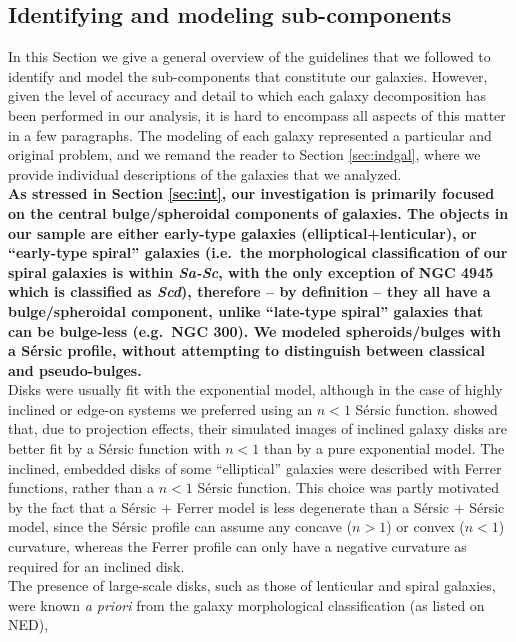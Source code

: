 \documentclass[preprint2]{emulateapj}
\begin{document}
\subsection{Identifying and modeling sub-components}
\label{sec:cpts}
In this Section we give a general overview of the guidelines that we followed to identify and model 
the sub-components that constitute our galaxies. 
However, given the level of accuracy and detail to which each galaxy decomposition has been performed in our analysis,
it is hard to encompass all aspects of this matter in a few paragraphs.
The modeling of each galaxy represented a particular and original problem, 
and we remand the reader to Section \ref{sec:indgal},
where we provide individual descriptions of the galaxies that we analyzed. \\
{\bf As stressed in Section \ref{sec:int}, our investigation is primarily focused on the central bulge/spheroidal components 
of galaxies. 
The objects in our sample are either early-type galaxies (elliptical+lenticular), 
or ``early-type spiral'' galaxies 
(i.e.~the morphological classification of our spiral galaxies is within \emph{Sa-Sc}, 
with the only exception of NGC 4945 which is classified as \emph{Scd}), 
therefore -- by definition -- they all have a bulge/spheroidal component, 
unlike ``late-type spiral'' galaxies that can be bulge-less (e.g.~NGC 300).   
We modeled spheroids/bulges with a S\'ersic profile, without attempting to distinguish between classical and pseudo-bulges. } \\
Disks were usually fit with the exponential model, 
although in the case of highly inclined or edge-on systems we preferred using an $n < 1$ S\'ersic function. 
\citet{pastrav2013a,pastrav2013b} showed that, due to projection effects, their simulated images of inclined galaxy disks 
are better fit by a S\'ersic function with $n < 1$ than by a pure exponential model.
The inclined, embedded disks of some ``elliptical'' galaxies were described with Ferrer functions, rather than a $n < 1$ S\'ersic function. 
This choice was partly motivated by the fact that a S\'ersic + Ferrer model is less degenerate than a S\'ersic + S\'ersic model, 
since the S\'ersic profile can assume any concave ($n > 1$) or convex ($n < 1$) curvature, 
whereas the Ferrer profile can only have a negative curvature as required for an inclined disk. \\
The presence of large-scale disks, such as those of lenticular and spiral galaxies, 
were known \emph{a priori} from the galaxy morphological classification (as listed on NED), 
\end{document}
